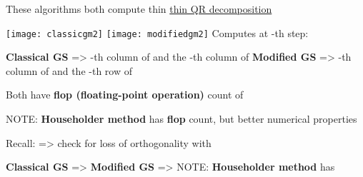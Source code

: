 \begin{itemize}

      \vItem
            These algorithms both compute thin \ul{thin QR decomposition}

            {
                  \texttt{[image: classicgm2]}
                  \texttt{[image: modifiedgm2]}
            }
      \vItem
            Computes at -th step:

            \begin{itemize}

                  \vItem
                        \textbf{Classical GS} => -th column of
                         and the -th column of 
                  \vItem
                        \textbf{Modified GS} => -th column of
                         and the -th row of 
            \end{itemize}
      \vItem
            Both have \textbf{flop (floating-point operation)} count of

            \begin{itemize}

                  \vItem
                        NOTE: \textbf{Householder method} has
                         \textbf{flop} count,
                        but better numerical properties
            \end{itemize}
      \vItem
            Recall:  =>
            check for loss of orthogonality with

            \begin{itemize}

                  \vItem
                        \textbf{Classical GS} =>
                  \vItem
                        \textbf{Modified GS} =>
                  \vItem
                        NOTE: \textbf{Householder method} has
            \end{itemize}
\end{itemize}

